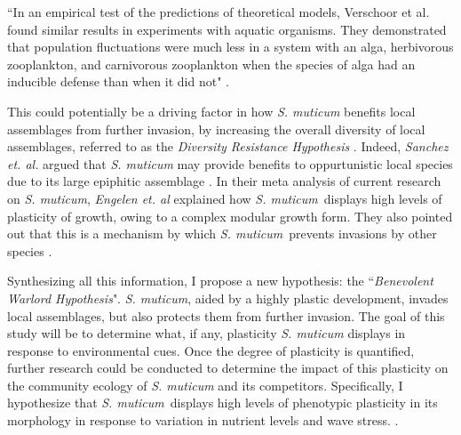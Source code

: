 \documentclass[12pt]{extarticle}
\newcommand\x{\textit{S. muticum}}
\begin{document}
\begin{displayquote} ``In an empirical test of the predictions of theoretical models, Verschoor et al. \cite{verschoor2004inducible} found similar results in experiments with aquatic organisms. They demonstrated that population fluctuations were much less in a system with an alga, herbivorous zooplankton, and carnivorous zooplankton when the species of alga had an inducible defense than when it did not" \cite{Miner2005}. \end{displayquote}
This could potentially be a driving factor in how \textit{S. muticum} benefits local assemblages from further invasion, by increasing the overall diversity of local assemblages, referred to as the \textit{Diversity Resistance Hypothesis} \cite{Incera2009}. Indeed, \textit{Sanchez et. al.} argued that \textit{S. muticum} may provide benefits to oppurtunistic local species due to its large epiphitic assemblage \cite{Sanchez2005}. In their meta analysis of current research on \textit{S. muticum}, \textit{Engelen et. al} explained how \x\ displays high levels of plasticity of growth, owing to a complex modular growth form. They also pointed out that this is a mechanism by which \x\ prevents invasions by other species \cite{Engelen2015}.


Synthesizing all this information, I propose a new hypothesis: the ``\textit{Benevolent Warlord Hypothesis}". \textit{S. muticum}, aided by a highly plastic development, invades local assemblages, but also protects them from further invasion. The goal of this study will be to determine what, if any, plasticity \textit{S. muticum} displays in response to environmental cues. Once the degree of plasticity is quantified, further research could be conducted to determine the impact of this plasticity on the community ecology of \textit{S. muticum} and its competitors. Specifically, I hypothesize that \x\ displays high levels of phenotypic plasticity in its morphology in response to variation in nutrient levels and wave stress.
\cite{10.3389/fpls.2015.00619}.

\end{document}
